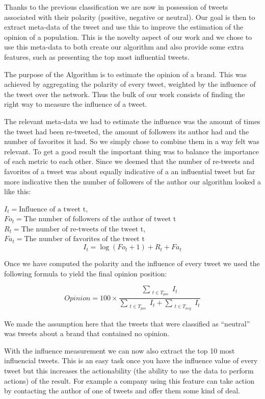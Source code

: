 \documentclass[a4paper,12pt]{report}
\begin{document}
Thanks to the previous classification we are now in possession of tweets associated with their polarity (positive, negative or neutral). Our goal is then to extract meta-data of the tweet and use this to improve the estimation of the opinion of a population.
This is the novelty aspect of our work and we chose to use this meta-data to both create our algorithm and also provide some extra features, such as presenting the top most influential tweets.

The purpose of the Algorithm is to estimate the opinion of a brand. 
This was achieved by aggregating the polarity of every tweet, weighted by the influence of the tweet over the network.
Thus the bulk of our work consists of finding the right way to measure the influence of a tweet.

The relevant meta-data we had to estimate the influence was the amount of times the tweet had been re-tweeted, the amount of followers its author had and the number of favorites it had. So we simply chose to combine them in a way felt was relevant. To get a good result the important thing was to balance the importance of each metric to each other. Since we deemed that the number of re-tweets and favorites of a tweet was about equally indicative of a an influential tweet but far more indicative then the number of followers of the author our algorithm looked a like this:

$I_t = \text{Influence of a tweet t}$, $Fo_t = \text{The number of followers of the author of tweet t}$\\
$R_t = \text{The number of re-tweets of the tweet t}$, $Fa_t = \text{The number of favorites of the tweet t}$\\
\begin{equation}
I_t = \log (Fo_t + 1) + R_t + Fa_t
\end{equation}

Once we have computed the polarity and the influence of every tweet we used the following formula to yield the final opinion position:

\begin{equation}
Opinion = 100 \times \frac{\sum_{\substack{t \in T_{pos}}} I_t}{\sum_{\substack{t \in T_{pos}}} I_t + \sum_{\substack{t \in T_{neg}}} I_t}
\end{equation}

We made the assumption here that the tweets that were classified as ``neutral'' was tweets about a brand that contained no opinion.

With the influence measurement we can now also extract the top 10 most influencial tweets. This is an easy task once you have the influence value of every tweet but this increases the actionability (the ability to use the data to perform actions) of the result. For example a company using this feature can take action by contacting the author of one of tweets and offer them some kind of deal.
\end{document}
